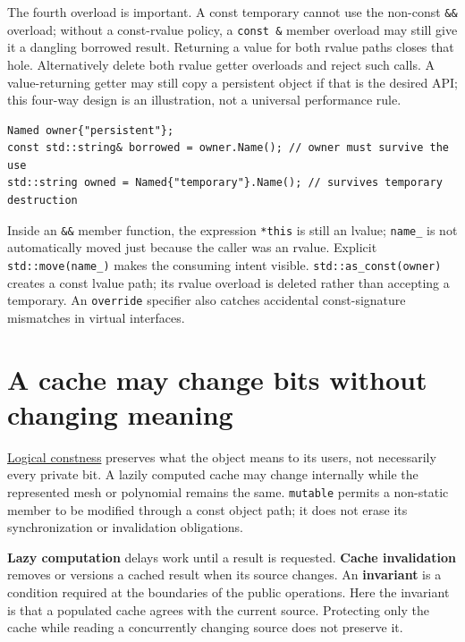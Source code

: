 The fourth overload is important. A const temporary cannot use the non-const \texttt{\&\&} overload; without a const-rvalue policy, a \texttt{const\ \&} member overload may still give it a dangling borrowed result. Returning a value for both rvalue paths closes that hole. Alternatively delete both rvalue getter overloads and reject such calls. A value-returning getter may still copy a persistent object if that is the desired API; this four-way design is an illustration, not a universal performance rule.

\begin{verbatim}
Named owner{"persistent"};
const std::string& borrowed = owner.Name(); // owner must survive the use
std::string owned = Named{"temporary"}.Name(); // survives temporary destruction
\end{verbatim}

Inside an \texttt{\&\&} member function, the expression \texttt{*this} is still an lvalue; \texttt{name\_} is not automatically moved just because the caller was an rvalue. Explicit \texttt{std::move(name\_)} makes the consuming intent visible. \texttt{std::as\_const(owner)} creates a const lvalue path; its rvalue overload is deleted rather than accepting a temporary. An \texttt{override} specifier also catches accidental const-signature mismatches in virtual interfaces.

\section{A cache may change bits without changing meaning}\label{01-foundations-i-ch003-a-cache-may-change-bits-without-changing-meaning}

\hyperref[appendix-f5593256bcaf]{Logical constness} preserves what the object means to its users, not necessarily every private bit. A lazily computed cache may change internally while the represented mesh or polynomial remains the same. \texttt{mutable} permits a non-static member to be modified through a const object path; it does not erase its synchronization or invalidation obligations.

\textbf{Lazy computation} delays work until a result is requested. \textbf{Cache invalidation} removes or versions a cached result when its source changes. An \textbf{invariant} is a condition required at the boundaries of the public operations. Here the invariant is that a populated cache agrees with the current source. Protecting only the cache while reading a concurrently changing source does not preserve it.

